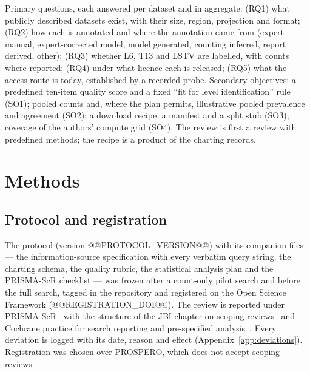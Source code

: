 \documentclass[11pt,a4paper]{article}
\begin{document}
Primary questions, each answered per dataset and in aggregate: (RQ1) what publicly described datasets exist, with their size, region, projection and format; (RQ2) how each is annotated and where the annotation came from (expert manual, expert-corrected model, model generated, counting inferred, report derived, other); (RQ3) whether L6, T13 and LSTV are labelled, with counts where reported; (RQ4) under what licence each is released; (RQ5) what the access route is today, established by a recorded probe. Secondary objectives: a predefined ten-item quality score and a fixed ``fit for level identification'' rule (SO1); pooled counts and, where the plan permits, illustrative pooled prevalence and agreement (SO2); a download recipe, a manifest and a split stub (SO3); coverage of the authors' compute grid (SO4). The review is first a review with predefined methods; the recipe is a product of the charting records.

\section{Methods}

\subsection{Protocol and registration}\label{sec:protocol}
The protocol (version @@PROTOCOL_VERSION@@) with its companion files --- the information-source specification with every verbatim query string, the charting schema, the quality rubric, the statistical analysis plan and the PRISMA-ScR checklist --- was frozen after a count-only pilot search and before the full search, tagged in the repository and registered on the Open Science Framework (@@REGISTRATION_DOI@@). The review is reported under PRISMA-ScR~\citep{tricco2018prisma} with the structure of the JBI chapter on scoping reviews~\citep{peters2020jbi} and Cochrane practice for search reporting and pre-specified analysis~\citep{higgins2023cochrane}. Every deviation is logged with its date, reason and effect (Appendix~\ref{app:deviations}). Registration was chosen over PROSPERO, which does not accept scoping reviews.
\end{document}
